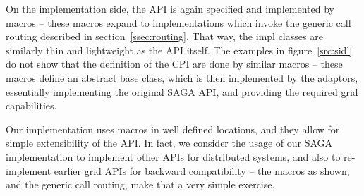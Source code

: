 On the implementation side, the API is again specified and implemented
by macros -- these macros expand to implementations which invoke the
generic call routing described in section~\ref{ssec:routing}.  That way,
the impl classes are similarly thin and lightweight as the API
itself.  The examples in figure~\ref{src:sidl} do not show that the
definition of the CPI are done by similar macros -- these macros
define an abstract base class, which is then implemented by the
adaptors, essentially implementing the original SAGA API, and
providing the required grid capabilities.

Our implementation uses macros in well defined locations, and they
allow for simple extensibility of the API.  In fact, we consider the
usage of our SAGA implementation to implement other APIs for
distributed systems, and also to re-implement earlier grid APIs for
backward compatibility -- the macros as shown, and the generic call
routing, make that a very simple exercise.

